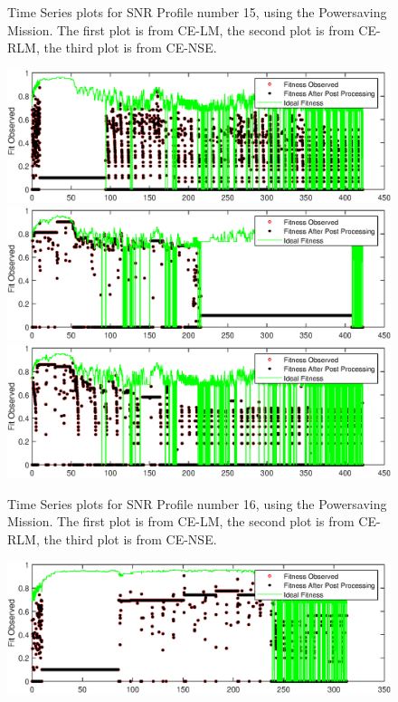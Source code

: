 \begin{appendices}
\begin{figure}[ht!]
\caption{Time Series plots for SNR Profile number 15, using the Powersaving Mission. The first plot is from CE-LM, the second plot is from CE-RLM, the third plot is from CE-NSE.}
\end{figure}
\begin{figure}[ht!]
\includegraphics{figures/c_sim_timeSeries/Fitness_timeSeries_LM_16.eps}
\includegraphics{figures/c_sim_timeSeries/Fitness_timeSeries_RLM_16.eps}
\includegraphics{figures/c_sim_timeSeries/Fitness_timeSeries_NSE_16.eps}
\caption{Time Series plots for SNR Profile number 16, using the Powersaving Mission. The first plot is from CE-LM, the second plot is from CE-RLM, the third plot is from CE-NSE.}
\end{figure}
\begin{figure}[ht!]
\includegraphics{figures/c_sim_timeSeries/Fitness_timeSeries_LM_17.eps}

\end{figure}
\end{appendices}
